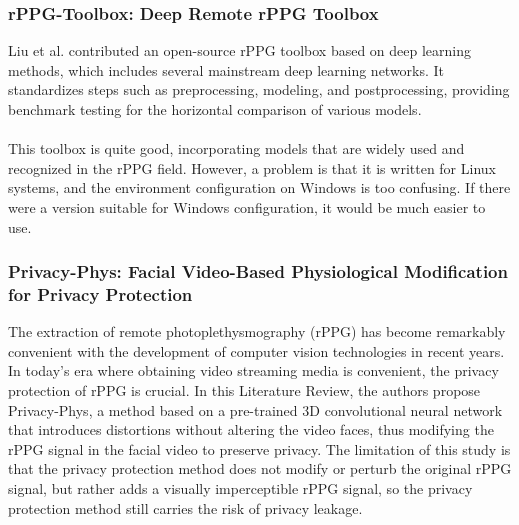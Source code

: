\documentclass[a4paper]{article}
\begin{document}
\subsubsection{rPPG-Toolbox: Deep Remote rPPG Toolbox}
Liu et al. contributed an open-source rPPG toolbox based on deep learning methods, which includes several mainstream deep learning networks. It standardizes steps such as preprocessing, modeling, and postprocessing, providing benchmark testing for the horizontal comparison of various models\cite{liu2024rppg}.\\
\\This toolbox is quite good, incorporating models that are widely used and recognized in the rPPG field. However, a problem is that it is written for Linux systems, and the environment configuration on Windows is too confusing. If there were a version suitable for Windows configuration, it would be much easier to use.
\subsubsection{Privacy-Phys: Facial Video-Based Physiological Modification for Privacy Protection}
The extraction of remote photoplethysmography (rPPG) has become remarkably convenient with the development of computer vision technologies in recent years. In today's era where obtaining video streaming media is convenient, the privacy protection of rPPG is crucial. In this Literature Review, the authors propose Privacy-Phys, a method based on a pre-trained 3D convolutional neural network that introduces distortions without altering the video faces, thus modifying the rPPG signal in the facial video to preserve privacy. The limitation of this study is that the privacy protection method does not modify or perturb the original rPPG signal, but rather adds a visually imperceptible rPPG signal, so the privacy protection method still carries the risk of privacy leakage\cite{sun2022privacy}.

\end{document}

